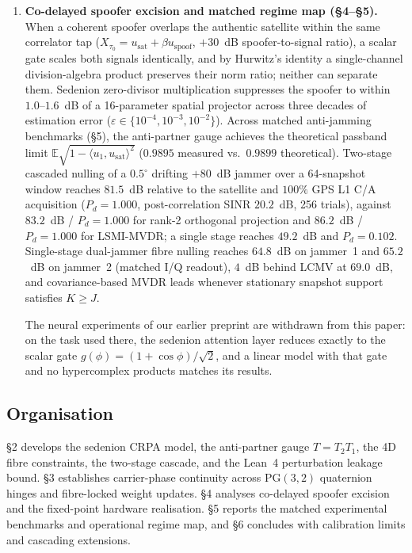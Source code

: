\begin{enumerate}
\item \textbf{Co-delayed spoofer excision and matched regime map (\S4--\S5).}
When a coherent spoofer overlaps the authentic satellite within the same correlator tap
($X_{\tau_0}=u_{\mathrm{sat}}+\beta u_{\mathrm{spoof}}$, $+30$~dB spoofer-to-signal ratio), a
scalar gate scales both signals identically, and by Hurwitz's identity a single-channel
division-algebra product preserves their norm ratio; neither can separate them. Sedenion
zero-divisor multiplication suppresses the spoofer to within $1.0$--$1.6$~dB of a 16-parameter
spatial projector across three decades of estimation error
($\varepsilon\in\{10^{-4},10^{-3},10^{-2}\}$). Across matched anti-jamming benchmarks (\S5), the
anti-partner gauge achieves the theoretical passband limit
$\mathbb{E}\sqrt{1-\langle u_1,u_{\mathrm{sat}}\rangle^2}$ ($0.9895$ measured vs.\ $0.9899$
theoretical). Two-stage cascaded nulling of a $0.5^\circ$ drifting $+80$~dB jammer over a
64-snapshot window reaches $81.5$~dB relative to the satellite and $100\%$ GPS L1 C/A
acquisition ($P_d=1.000$, post-correlation SINR $20.2$~dB, 256 trials), against $83.2$~dB /
$P_d=1.000$ for rank-2 orthogonal projection and $86.2$~dB / $P_d=1.000$ for LSMI-MVDR; a single
stage reaches $49.2$~dB and $P_d=0.102$. Single-stage dual-jammer fibre nulling reaches
$64.8$~dB on jammer~1 and $65.2$~dB on jammer~2 (matched I/Q readout), $4$~dB behind LCMV at
$69.0$~dB, and covariance-based MVDR leads whenever stationary snapshot support satisfies
$K\ge J$.

The neural experiments of our earlier preprint \cite{agourakis2026gnss} are withdrawn from this
paper: on the task used there, the sedenion attention layer reduces exactly to the scalar gate
$g(\phi)=(1+\cos\phi)/\sqrt{2}$, and a linear model with that gate and no hypercomplex products
matches its results.
\end{enumerate}

\subsection*{Organisation}
\S2 develops the sedenion CRPA model, the anti-partner gauge $T=T_2T_1$, the 4D fibre
constraints, the two-stage cascade, and the Lean~4 perturbation leakage bound. \S3 establishes
carrier-phase continuity across $\mathrm{PG}(3,2)$ quaternion hinges and fibre-locked weight
updates. \S4 analyses co-delayed spoofer excision and the fixed-point hardware realisation. \S5 reports
the matched experimental benchmarks and operational regime map, and \S6 concludes with
calibration limits and cascading extensions.
